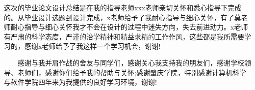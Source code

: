 \documentclass[master]{seuthesis} %
\begin{document}
\begin{Acknowledgement}{}
这次的毕业论文设计总结是在我的指导老师xxx老师亲切关怀和悉心指导下完成的。从毕业设计选题到设计完成，x老师给予了我耐心指导与细心关怀，有了莫老师耐心指导与细心关怀我才不会在设计的过程中迷失方向，失去前进动力。x老师有严肃的科学态度，严谨的治学精神和精益求精的工作作风，这些都是我所需要学习的，感谢x老师给予了我这样一个学习机会，谢谢!

　　感谢与我并肩作战的舍友与同学们，感谢关心我支持我的朋友们，感谢学校领导、老师们，感谢你们给予我的帮助与关怀;感谢肇庆学院，特别感谢计算机科学与软件学院四年来为我提供的良好学习环境，谢谢!
\end{Acknowledgement}





\newpage
\printindex %



% 
% 
\end{document}
